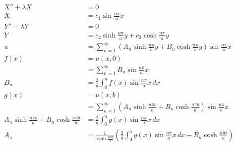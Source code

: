 \documentclass{article}
\begin{document}
\setcounter{subsubsection}{12}
\subsubsection{}

\begin{align*}
  X'' + \lambda X                                           & = 0                                                                                                                                    \\
  X                                                         & = c_1 \sin \frac{n \pi}{a} x                                                                                                           \\
  Y'' - \lambda Y                                           & = 0                                                                                                                                    \\
  Y                                                         & = c_2 \sinh \frac{n \pi}{a} y + c_3 \cosh \frac{n \pi}{a} y                                                                            \\
  u                                                         & = \sum_{n = 1}^\infty \left( A_n \sinh \frac{n \pi}{a} y + B_n \cosh \frac{n \pi}{a} y \right) \sin \frac{n \pi}{a} x                  \\
  f(x)                                                      & = u(x, 0)                                                                                                                              \\
                                                            & = \sum_{n = 1}^\infty B_n \sin \frac{n \pi}{a} x                                                                                       \\
  B_n                                                       & = \frac{2}{a} \int_0^a f(x) \sin \frac{n \pi}{a} x \,d x                                                                               \\
  g(x)                                                      & = u(x, b)                                                                                                                              \\
                                                            & = \sum_{n = 1}^\infty \left( A_n \sinh \frac{n \pi b}{a} + B_n \cosh \frac{n \pi b}{a} \right) \sin \frac{n \pi}{a} x                  \\
  A_n \sinh \frac{n \pi b}{a} + B_n \cosh \frac{n \pi b}{a} & = \frac{2}{a} \int_0^a g(x) \sin \frac{n \pi}{a} x \,dx                                                                                \\
  A_n                                                       & = \frac{1}{\sinh \frac{n \pi b}{a}} \left( \frac{2}{a} \int_0^a g(x) \sin \frac{n \pi}{a} x \,dx - B_n \cosh \frac{n \pi b}{a} \right)
\end{align*}
\end{document}
